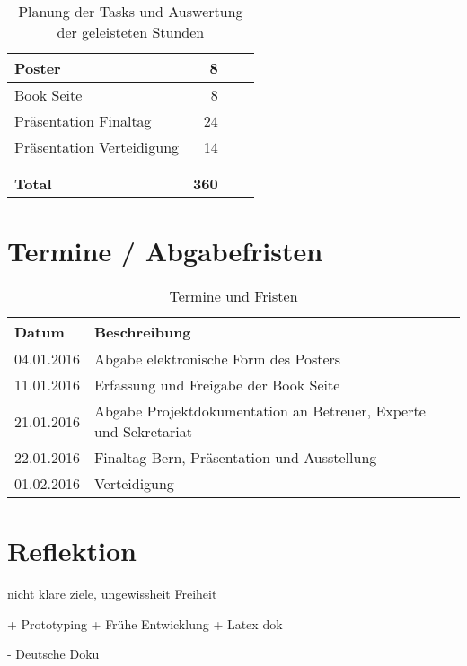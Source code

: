 \begin{table}[H]
\begin{tabularx}{\textwidth}{|l|r|r|X|}
 Poster                             &   8  &       &   \\ \hline
 Book Seite                         &   8  &       &   \\ \hline
 Präsentation Finaltag              &  24  &       &   \\ \hline
 Präsentation Verteidigung          &  14  &       &   \\ \hline
     &      &       &   \\ \hline
     &      &       &   \\ \hline
 \textbf{Total}                     & \textbf{360}  &       &   \\ \hline
     
 \hline

\end{tabularx}
\caption{Planung der Tasks und Auswertung der geleisteten Stunden}
\end{table}


\section{Termine / Abgabefristen}
\begin{table}[H]
\begin{tabularx}{\textwidth}{|l|X|}

 \hline \rowcolor{lightgray}
 {\bf Datum } & {\bf Beschreibung } \\  \hline
 04.01.2016   & Abgabe elektronische Form des Posters  \\ \hline
 11.01.2016   & Erfassung und Freigabe der Book Seite  \\ \hline
 21.01.2016   & Abgabe Projektdokumentation an Betreuer, Experte und Sekretariat  \\ \hline
 22.01.2016   & Finaltag Bern, Präsentation und Ausstellung  \\ \hline
 01.02.2016   & Verteidigung \\ \hline

\end{tabularx}
\caption{Termine und Fristen}
\end{table}

\section{Reflektion}
nicht klare ziele, ungewissheit
Freiheit


+ Prototyping
+ Frühe Entwicklung
+ Latex dok


- Deutsche Doku
